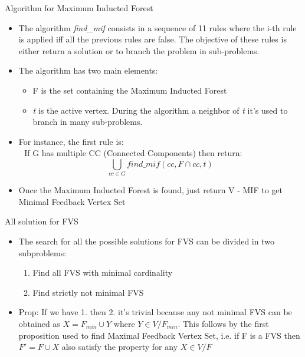 \documentclass[11pt]{beamer}
\begin{document}
	\begin{frame}{Algorithm for Maximum Inducted Forest}
		\begin{itemize}
			\item The algorithm \textit{find\_mif} consists in a sequence of 11 rules where the i-th rule is applied iff all the previous rules are false. The objective of these rules is either return a solution or to branch the problem in sub-problems.
			\item The algorithm has two main elements:
				\begin{itemize}
					\item F is the set containing the Maximum Inducted Forest
					\item \textit{t} is the active vertex. During the algorithm a neighbor of \textit{t} it's used to branch in many sub-problems.
				\end{itemize}
			\item For instance, the first rule is: \\ \,\, If G has multiple CC (Connected Components) then return: $$ \bigcup_{cc \in G} find\_mif\left(cc, F \cap cc, t \right) $$
			\item Once the Maximum Inducted Forest is found, just return V - MIF to get Minimal Feedback Vertex Set
		\end{itemize}
	\end{frame}
	\begin{frame}{All solution for FVS}
		\begin{itemize}
			\item The search for all the possible solutions for FVS can be divided in two subproblems:
			\begin{enumerate}
				\item Find all FVS with minimal cardinality
				\item Find strictly not minimal FVS 
			\end{enumerate}
			\item  Prop: If we have 1. then 2. it's trivial because any not minimal FVS can be obtained as $ X = F_{min} \cup Y $ where $ Y \in V / F_{min} $. This follows by the first proposition used to find Maximal Feedback Vertex Set, i.e. if F is a FVS then $ F' = F \cup X $ also satisfy the property for any  $ X \in V / F $
		\end{itemize}
	\end{frame}
\end{document}
